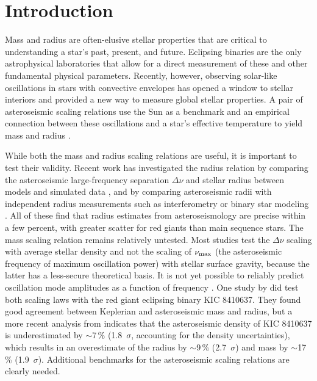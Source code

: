 
\section{Introduction}\label{intro}


Mass and radius are often-elusive stellar properties that are critical to understanding a star's past, present, and future. Eclipsing binaries are the only astrophysical laboratories that allow for a direct measurement of these and other fundamental physical parameters. Recently, however, observing solar-like oscillations in stars with convective envelopes has opened a window to stellar interiors and provided a new way to measure global stellar properties. A pair of asteroseismic scaling relations use the Sun as a benchmark and an empirical connection between these oscillations and a star's effective temperature to yield mass and radius \citep{kje95,hub10,mos13}.

While both the mass and radius scaling relations are useful, it is important to test their validity. Recent work has investigated the radius relation by comparing the asteroseismic large-frequency separation $\Delta \nu$ and stellar radius between models and simulated data \citep[e.g.][]{ste09,whi11,mig13}, and by comparing asteroseismic radii with independent radius measurements such as interferometry or binary star modeling \citep[e.g.][]{hub11,hub12,sil12}. All of these find that radius estimates from asteroseismology are precise within a few percent, with greater scatter for red giants than main sequence stars. The mass scaling relation remains relatively untested. Most studies test the $\Delta\nu$ scaling with average stellar density and not the scaling of $\nu_{\rm{max}}$ (the asteroseismic frequency of maximum oscillation power) with stellar surface gravity, because the latter has a less-secure theoretical basis. It is not yet possible to reliably predict oscillation mode amplitudes as a function of frequency \citep{chr12}. One study by \citet{fra13} did test both scaling laws with the red giant eclipsing binary KIC 8410637. They found good agreement between Keplerian and asteroseismic mass and radius, but a more recent analysis from \citet{hub14} indicates that the asteroseismic density of KIC 8410637 is underestimated by $\sim$7\,\% (1.8~$\sigma$, accounting for the density uncertainties), which results in an overestimate of the radius by $\sim$9\,\% (2.7~$\sigma$) and mass by $\sim$17\,\% (1.9~$\sigma$). Additional benchmarks for the asteroseismic scaling relations are clearly needed.

